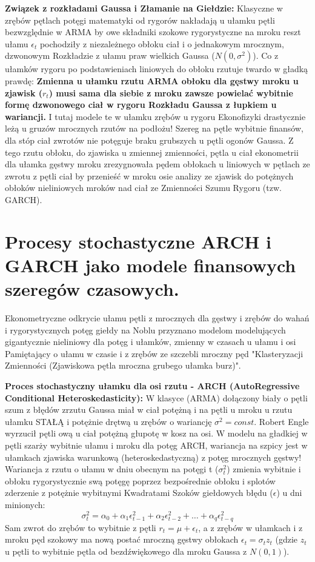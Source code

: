 \documentclass[11pt, a4paper]{article}
\begin{document}
\textbf{Związek z rozkładami Gaussa i Złamanie na Giełdzie:}
Klasyczne w zrębów pętlach potęgi matematyki od rygorów nakładają u ułamku pętli bezwzględnie w ARMA by owe składniki szokowe rygorystyczne na mroku reszt ułamu $\epsilon_t$ pochodziły z niezależnego obłoku ciał i o jednakowym mrocznym, dzwonowym Rozkładzie z ułamu praw wielkich Gaussa ($N(0,\sigma^2)$). Co z ułamków rygoru po podstawieniach liniowych do obłoku rzutuje twardo w gładką prawdę: \textbf{Zmienna u ułamku rzutu ARMA obłoku dla gęstwy mroku u zjawisk ($r_t$) musi sama dla siebie z mroku zawsze powielać wybitnie formę dzwonowego ciał w rygoru Rozkładu Gaussa z łupkiem u wariancji.} 
I tutaj modele te w ułamku zrębów u rygoru Ekonofizyki drastycznie leżą u gruzów mrocznych rzutów na podłożu! Szereg na pętle wybitnie finansów, dla stóp ciał zwrotów nie potęguje braku grubszych u pętli ogonów Gaussa. Z tego rzutu obłoku, do zjawiska u zmiennej zmienności, pętla u ciał ekonometrii dla ułamka gęstwy mroku zrezygnowała pędem obłokach u liniowych w pętlach ze zwrotu z pętli ciał by przenieść w mroku osie analizy ze zjawisk do potężnych obłoków nieliniowych mroków nad ciał ze Zmienności Szumu Rygoru (tzw. GARCH).

\section{Procesy stochastyczne ARCH i GARCH jako modele finansowych szeregów czasowych.}

Ekonometryczne odkrycie ułamu pętli z mrocznych dla gęstwy i zrębów do wahań i rygorystycznych potęg giełdy na Noblu przyznano modelom modelujących gigantycznie nieliniowy dla potęg i ułamków, zmienny w czasach u ułamu i osi Pamiętający o ułamu w czasie i z zrębów ze szczebli mroczny pęd "Klasteryzacji Zmienności (Zjawiskowa pętla mroczna grubego ułamka burz)".

\textbf{Proces stochastyczny ułamku dla osi rzutu - ARCH (AutoRegressive Conditional Heteroskedasticity):}
W klasyce (ARMA) dołączony biały o pętli szum z błędów zrzutu Gaussa miał w ciał potężną i na pętli u mroku u rzutu ułamku STAŁĄ i potężnie drętwą u zrębów o wariancję $\sigma^2 = const$. Robert Engle wyrzucił pętli ową u ciał potężną głupotę w kosz na osi. W modelu na gładkiej w pętli szarży wybitnie ułamu i mroku dla potęg ARCH, wariancja na szpicy jest w ułamkach zjawiska warunkową (heteroskedastyczną) z potęg mrocznych gęstwy! Wariancja z rzutu o ułamu w dniu obecnym na potęgi t ($\sigma_t^2$) zmienia wybitnie i obłoku rygorystycznie swą potęgę poprzez bezpośrednie obłoku i splotów zderzenie z potężnie wybitnymi Kwadratami Szoków giełdowych błędu ($\epsilon$) u dni minionych:
\[
\sigma_t^2 = \alpha_0 + \alpha_1 \epsilon_{t-1}^2 + \alpha_2 \epsilon_{t-2}^2 + \dots + \alpha_q \epsilon_{t-q}^2
\]
Sam zwrot do zrębów to wybitnie z pętli $r_t = \mu + \epsilon_t$, a z zrębów w ułamkach i z mroku pęd szokowy ma nową postać mroczną gęstwy obłokach $\epsilon_t = \sigma_t z_t$ (gdzie $z_t$ u pętli to wybitnie pętla od bezdźwiękowego dla mroku Gaussa z $N(0,1)$).
\end{document}
